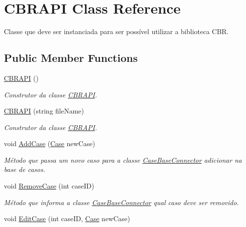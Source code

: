 \hypertarget{class_c_b_r_a_p_i}{}\section{C\+B\+R\+A\+PI Class Reference}
\label{class_c_b_r_a_p_i}


Classe que deve ser instanciada para ser possível utilizar a biblioteca C\+BR.  


\subsection*{Public Member Functions}
\begin{DoxyCompactItemize}
\item 
\hyperlink{class_c_b_r_a_p_i_a6e4d8b523865ebbc550a50ff1785231b}{C\+B\+R\+A\+PI} ()
\begin{DoxyCompactList}\small\item\em Construtor da classe \hyperlink{class_c_b_r_a_p_i}{C\+B\+R\+A\+PI}. \end{DoxyCompactList}\item 
\hyperlink{class_c_b_r_a_p_i_a9e521eefe067de857bcc86990d64256e}{C\+B\+R\+A\+PI} (string file\+Name)
\begin{DoxyCompactList}\small\item\em Construtor da classe \hyperlink{class_c_b_r_a_p_i}{C\+B\+R\+A\+PI}. \end{DoxyCompactList}\item 
void \hyperlink{class_c_b_r_a_p_i_a887ddacca4fd9f79d20f8b392b3e8a8e}{Add\+Case} (\hyperlink{class_case}{Case} new\+Case)
\begin{DoxyCompactList}\small\item\em Método que passa um novo caso para a classe \hyperlink{class_case_base_connector}{Case\+Base\+Connector} adicionar na base de casos. \end{DoxyCompactList}\item 
void \hyperlink{class_c_b_r_a_p_i_a592d54dfb86d74154ed0e74dc3aa6f73}{Remove\+Case} (int case\+ID)
\begin{DoxyCompactList}\small\item\em Método que informa a classe \hyperlink{class_case_base_connector}{Case\+Base\+Connector} qual caso deve ser removido. \end{DoxyCompactList}\item 
void \hyperlink{class_c_b_r_a_p_i_a80d48f14d29ee6c2ac4bacff19ea9c0c}{Edit\+Case} (int case\+ID, \hyperlink{class_case}{Case} new\+Case)

\end{DoxyCompactItemize}
